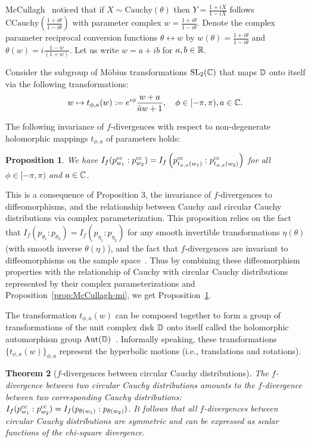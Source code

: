 \documentclass[journal]{IEEEtran}
\newtheorem{theorem}{Theorem}
\newtheorem{proposition}[theorem]{Proposition}
\begin{document}
McCullagh~\cite{mccullagh1992conditional} noticed that if $X\sim\mathrm{Cauchy}(\theta)$ 
then $Y=\frac{1+iX}{1-iX}$ follows $\mathrm{CCauchy}\left(\frac{1+i\theta}{1-i\theta}\right)$ with parameter complex $w=\frac{1+i\theta}{1-i\theta}$. 
Denote the complex parameter reciprocal conversion functions $\theta\leftrightarrow w$ by $w(\theta)=\frac{1+i\theta}{1-i\theta}$ 
and $\theta(w)=i\frac{1-w}{(1+w)}$.   
Let us write $w=a+ib$ for $a,b\in{\mathbb{R}}$.

Consider the subgroup of M\"obius transformations $\mathrm{SL}_2(\mathbb{C})$ that maps $\mathbb{D}$ onto itself via the following transformations:
$$
w\mapsto t_{\phi,a}(w):=e^{i\phi} \frac{w+a}{\bar{a}w+1},\quad \phi\in [-\pi,\pi), a\in\mathbb{C}.
$$


The following invariance of $f$-divergences with respect to non-degenerate holomorphic mappings $t_{\phi,a}$ of parameters holds:

\begin{proposition}\label{thm:ccfdiv}
We have $I_f(p^{\mathrm{cc}}_{w_1}:p^{\mathrm{cc}}_{w_2})=I_f \left(p^{\mathrm{cc}}_{t_{\phi,a}(w_1)}:p^{\mathrm{cc}}_{t_{\phi,a}(w_2)}\right)$ for all $\phi\in [-\pi,\pi)$ and $a\in\mathbb{C}$.
\end{proposition}


This is a consequence of Proposition 3, the invariance of $f$-divergences to diffeomorphisms, and the relationship between Cauchy and circular Cauchy distributions via complex parameterization. 
This proposition relies on the fact that $I_f(p_{\theta_1}:p_{\theta_2})=I_f(p_{\eta_1}:p_{\eta_2})$ for any smooth invertible transformations $\eta(\theta)$ (with smooth inverse $\theta(\eta)$), and the fact that 
$f$-divergences are invariant to diffeomorphisms on the sample space~\cite{fdivdiffeo-2010}.
Thus by combining these diffeomorphism properties with the relationship of Cauchy with circular Cauchy distributions represented by their complex parameterizations and Proposition~\ref{prop:McCullagh-mi}, we get  Proposition~\ref{thm:ccfdiv}. 

The transformation $t_{\phi,a}(w)$ can be composed together to form a group of transformations of the unit complex disk $\mathbb{D}$ onto itself called the holomorphic automorphism group  $\mathrm{Aut}(\mathbb{D})$~\cite{ungar1994holomorphic,needham1998visual}. 
Informally speaking, these transformations $\{t_{\phi,a}(w)\}_{\phi,a}$ represent the hyperbolic motions (i.e., translations and rotations).


\begin{theorem}[$f$-divergences between circular Cauchy distributions]\label{thm:fdivsymCC}
The $f$-divergence between two circular Cauchy distributions amounts to the $f$-divergence between two corresponding Cauchy distributions:
$I_f(p^{\mathrm{cc}}_{w_1}:p^{\mathrm{cc}}_{w_2})=I_f(p_{\theta(w_1)}:p_{\theta(w_2)})$.
It follows that all $f$-divergences between circular Cauchy distributions are symmetric and can be expressed as scalar functions of the chi-square divergence.
\end{theorem}
\end{document}
